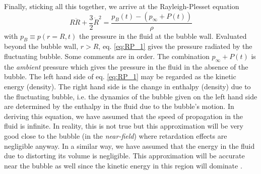 \documentclass[rmp,aps,nofootinbib,superscriptaddress,floatfix]{revtex4-2}
\begin{document}
Finally, sticking all this together, we arrive at the Rayleigh-Plesset equation \cite{prosperetti1999old,prosperetti1986bubble,leighton2007derivation,plesset1949dynamics,plesset1977bubble}
\begin{equation}
    R\ddot{R}+\frac{3}{2}\dot{R}^2 = \frac{p_B(t)-(p_\infty+P(t))}{\rho}
    \label{eq:RP_1}
\end{equation}
with $p_B \equiv p(r=R,t)$ the pressure in the fluid at the bubble wall. Evaluated beyond the bubble wall, $r > R$, eq. \ref{eq:RP_1} gives the pressure radiated by the fluctuating bubble. Some comments are in order. The combination $p_\infty+P(t)$ is the \emph{ambient} pressure \cite{prosperetti1999old,prosperetti1986bubble} which gives the pressure in the fluid in the absence of the bubble. The left hand side of eq. \ref{eq:RP_1} may be regarded as the kinetic energy (density). The right hand side is the change in enthalpy (density) due to the fluctuating bubble, i.e. the dynamics of the bubble given on the left hand side are determined by the enthalpy in the fluid due to the bubble's motion. In deriving this equation, we have assumed that the speed of propagation in the fluid is infinite. In reality, this is not true but this approximation will be very good close to the bubble (in the \emph{near-field}) where retardation effects are negligible anyway. In a similar way, we have assumed that the energy in the fluid due to distorting its volume is negligible. This approximation will be accurate near the bubble as well since the kinetic energy in this region will dominate \cite{prosperetti1999old}. 
\end{document}
